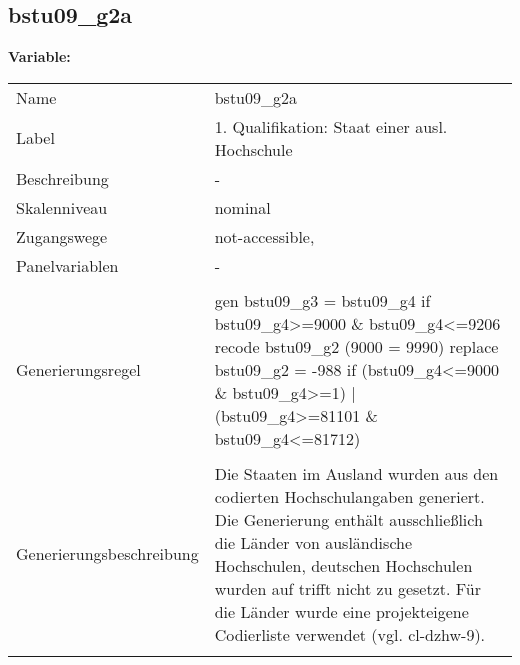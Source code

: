 	
	
	\subsection{bstu09\_g2a}
	\label{subSection:bstu09_g2a}

	\noindent\textbf{Variable:}\\
		\begin{tabular}{lL{11.3cm}}
			\label{tableVariable:bstu09_g2a}
			Name & bstu09\_g2a \\
			Label & 1. Qualifikation: Staat einer ausl. Hochschule \\
			Beschreibung & - \\
			Skalenniveau & nominal \\
			Zugangswege &
				not-accessible,
 \\
			Panelvariablen & -
			 \\
			 \\
					Generierungsregel & gen bstu09\_g3 = bstu09\_g4 if bstu09\_g4\textgreater{}=9000 \& bstu09\_g4\textless{}=9206
recode bstu09\_g2 (9000 = 9990)
replace bstu09\_g2 = -988 if (bstu09\_g4\textless{}=9000 \& bstu09\_g4\textgreater{}=1) | (bstu09\_g4\textgreater{}=81101 \& bstu09\_g4\textless{}=81712) \\
				 \\
					Generierungsbeschreibung & Die Staaten im Ausland wurden aus den codierten Hochschulangaben generiert. Die Generierung enthält ausschließlich die Länder von ausländische Hochschulen, deutschen Hochschulen wurden auf trifft nicht zu gesetzt. Für die Länder wurde eine projekteigene Codierliste verwendet (vgl. cl-dzhw-9).
				 \\	
			 \\
		\end{tabular}






	
	\newpage
